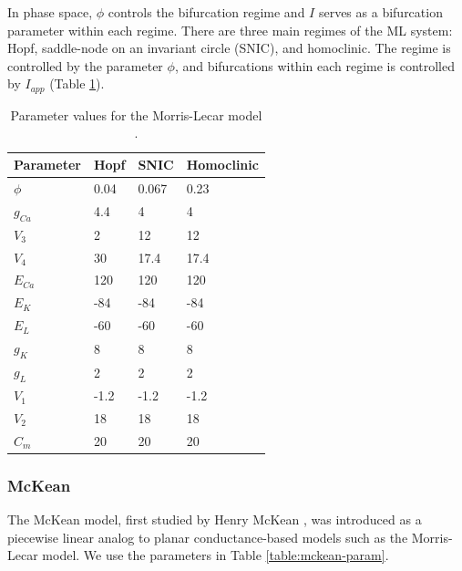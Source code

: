 \documentclass[12pt]{article}
\begin{document}
In phase space, $\phi$ controls the bifurcation regime and $I$ serves as a bifurcation parameter within each regime.  There are three main regimes of the ML system: Hopf, saddle-node on an invariant circle (SNIC), and homoclinic.  The regime is controlled by the parameter $\phi$, and bifurcations within each regime is controlled by $I_{app}$ (Table \ref{table:ml-param}).

\begin{table}[h!]
\centering
\caption{Parameter values for the Morris-Lecar model \cite{ErmentroutTerman2010book}.}
    \begin{tabular}{  l | l | l | l }
    \hline
    Parameter	& Hopf	& SNIC	& Homoclinic \\ \hline
    $\phi$	& 0.04	& 0.067	& 0.23	 \\ \hline
    $g_{Ca}$	& 4.4	& 4	& 4	\\ \hline
    $V_3$	& 2	& 12 	& 12	\\ \hline
    $V_4$	& 30 	& 17.4	& 17.4	\\ \hline
    $E_{Ca}$ 	& 120	& 120 	& 120	\\ \hline
    $E_{K}$	& -84	& -84 	& -84	\\ \hline
    $E_L$	& -60 	& -60 	& -60 	\\ \hline
    $g_K$	& 8 	& 8 	& 8 	\\ \hline
    $g_L$	& 2 	& 2 	& 2 	\\ \hline
    $V_1$	& -1.2 	& -1.2 	& -1.2	\\ \hline
    $V_2$	& 18 	& 18 	& 18  	\\ \hline
    $C_m$	& 20 	& 20 	& 20	
    \end{tabular}
\label{table:ml-param}\end{table}


\subsubsection{McKean}\label{app:mckean}
The McKean model, first studied by Henry McKean \cite{McKean1970}, 
was introduced as a piecewise linear analog to planar conductance-based models such as the Morris-Lecar model. We use the parameters in Table \ref{table:mckean-param}.
\end{document}
